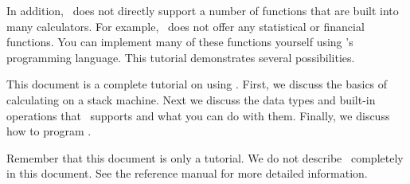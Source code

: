 In addition, \CLAC\ does not directly support a number of functions that are built into many
calculators. For example, \CLAC\ does not offer any statistical or financial functions. You can
implement many of these functions yourself using \CLAC's programming language. This tutorial
demonstrates several possibilities.

This document is a complete tutorial on using \CLAC. First, we discuss the basics of calculating
on a stack machine. Next we discuss the data types and built-in operations that \CLAC\ supports
and what you can do with them. Finally, we discuss how to program \CLAC.

Remember that this document is only a tutorial. We do not describe \CLAC\ completely in this
document. See the reference manual for more detailed information.
